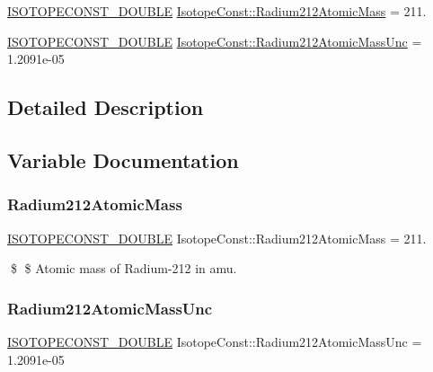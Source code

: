 \begin{DoxyCompactItemize}
\item 
\mbox{\hyperlink{group___isotope_const-_macros_ga8f45a7272ce02c0b4c65c44636ed719a}{I\+S\+O\+T\+O\+P\+E\+C\+O\+N\+S\+T\+\_\+\+D\+O\+U\+B\+LE}} \mbox{\hyperlink{group___isotope_const-_radium-_ra212_gacad79181ebb1fb207e5ea5d27b66566d}{Isotope\+Const\+::\+Radium212\+Atomic\+Mass}} = 211.
\item 
\mbox{\hyperlink{group___isotope_const-_macros_ga8f45a7272ce02c0b4c65c44636ed719a}{I\+S\+O\+T\+O\+P\+E\+C\+O\+N\+S\+T\+\_\+\+D\+O\+U\+B\+LE}} \mbox{\hyperlink{group___isotope_const-_radium-_ra212_gae31d42e3ad4f9bfb554d188e7ee03f3a}{Isotope\+Const\+::\+Radium212\+Atomic\+Mass\+Unc}} = 1.\+2091e-\/05
\end{DoxyCompactItemize}


\subsection{Detailed Description}


\subsection{Variable Documentation}
\mbox{\label{group___isotope_const-_radium-_ra212_gacad79181ebb1fb207e5ea5d27b66566d}} 
\subsubsection{\texorpdfstring{Radium212\+Atomic\+Mass}{Radium212AtomicMass}}
{\footnotesize\ttfamily \mbox{\hyperlink{group___isotope_const-_macros_ga8f45a7272ce02c0b4c65c44636ed719a}{I\+S\+O\+T\+O\+P\+E\+C\+O\+N\+S\+T\+\_\+\+D\+O\+U\+B\+LE}} Isotope\+Const\+::\+Radium212\+Atomic\+Mass = 211.}

\$ \$ Atomic mass of Radium-\/212 in amu. \mbox{\label{group___isotope_const-_radium-_ra212_gae31d42e3ad4f9bfb554d188e7ee03f3a}} 
\subsubsection{\texorpdfstring{Radium212\+Atomic\+Mass\+Unc}{Radium212AtomicMassUnc}}
{\footnotesize\ttfamily \mbox{\hyperlink{group___isotope_const-_macros_ga8f45a7272ce02c0b4c65c44636ed719a}{I\+S\+O\+T\+O\+P\+E\+C\+O\+N\+S\+T\+\_\+\+D\+O\+U\+B\+LE}} Isotope\+Const\+::\+Radium212\+Atomic\+Mass\+Unc = 1.\+2091e-\/05}

